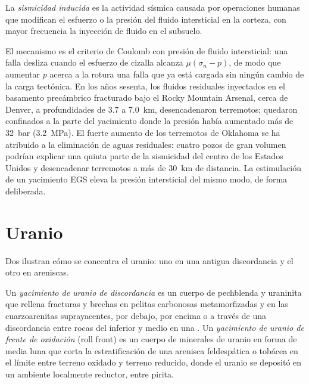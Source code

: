 \begin{definition}\label{def:b2:energy-geology:induced}
La \emph{sismicidad inducida} es la actividad sísmica causada por operaciones
humanas que modifican el esfuerzo o la presión del fluido intersticial en la corteza, con mayor frecuencia la
inyección de fluido en el subsuelo.
\end{definition}

El mecanismo es el criterio de Coulomb con presión de fluido intersticial: una falla desliza cuando el esfuerzo de cizalla
alcanza $\mu(\sigma_n - p)$, de modo que aumentar $p$ acerca a la rotura una falla que ya está cargada
sin ningún cambio de la carga tectónica. En los años sesenta, los fluidos residuales inyectados en el basamento
precámbrico fracturado bajo el Rocky Mountain Arsenal, cerca de Denver, a profundidades de 3.7 a
\qty{7.0}{km}, desencadenaron terremotos; quedaron confinados a la parte del yacimiento donde la
presión había aumentado más de \qty{32}{bar} (\qty{3.2}{MPa}). El fuerte aumento de los terremotos
de Oklahoma se ha atribuido a la eliminación de aguas residuales: cuatro pozos de gran
volumen podrían explicar una quinta parte de la sismicidad del centro de los Estados Unidos y desencadenar
terremotos a más de \qty{30}{km} de distancia. La estimulación de un yacimiento EGS eleva la presión intersticial del
mismo modo, de forma deliberada.

\section{Uranio}\label{sec:b2:energy-geology:uranium}

Dos  ilustran cómo se concentra el uranio: uno en una antigua discordancia y el
otro en areniscas.

\begin{definition}\label{def:b2:energy-geology:uranium}
Un \emph{yacimiento de uranio de discordancia} es un cuerpo
de pechblenda y uraninita que rellena fracturas y brechas en pelitas carbonosas metamorfizadas y
en las cuarzoarenitas suprayacentes, por debajo, por encima o a través de una discordancia entre rocas del 
inferior y medio en una . Un \emph{yacimiento de uranio de frente de oxidación}
(roll front) es un cuerpo de minerales de uranio en forma de media luna que corta la estratificación de una
arenisca feldespática o tobácea en el límite entre terreno oxidado y terreno reducido, donde el
uranio se depositó en un ambiente localmente reductor, entre pirita.
\end{definition}

